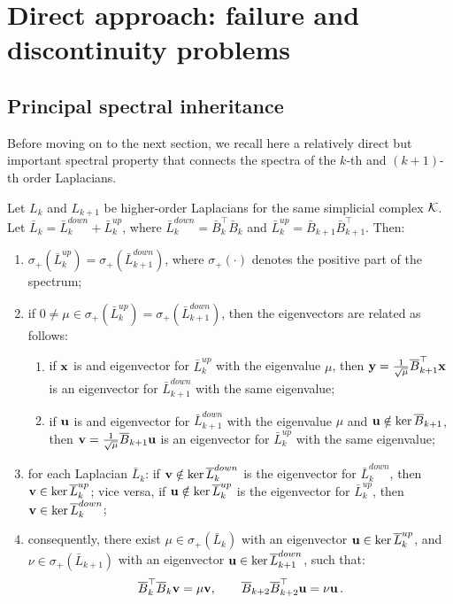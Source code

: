 \section{Direct approach: failure and discontinuity problems }


\subsection{Principal spectral inheritance}


Before moving on to the next section, we recall here a relatively direct  but important spectral property that connects the spectra of the $k$-th and $(k+1)$-th order Laplacians. 

\begin{theorem}\label{thm:inherit}
  Let $L_k$ and $L_{k+1}$ be  higher-order Laplacians for the same simplicial complex $\mathcal{K}$. Let $\bar L_k=\bar L_k^{down}+\bar L_k^{up}$, where $\bar L_k^{down}=\bar B_k^\top \bar B_k$ and $\bar L_k^{up}=\bar B_{k+1} \bar B_{k+1}^\top$. Then:
  \begin{enumerate}
    \item $\sigma_+(\bar L_k^{up})=\sigma_+(\bar L_{k+1}^{down})$, where $\sigma_+(\cdot)$ denotes the positive part of the spectrum;
    \item if $ 0 \ne \mu \in \sigma_+(\bar L_k^{up}) = \sigma_+(\bar L_{k+1}^{down})$, then the eigenvectors are related as follows:
    \begin{enumerate}
      \item if $\mathbf{x}$ is and eigenvector for $\bar L_k^{up}$ with the eigenvalue $\mu$, then $\mathbf{y} = \frac{1}{\sqrt{\mu}} \overline{B}_{k+1}^\top \mathbf{x}$ is an eigenvector for $\bar L_{k+1}^{down}$ with the same eigenvalue;
      \item if $\mathbf{u}$ is and eigenvector for $\bar L_{k+1}^{down}$ with the eigenvalue $\mu$ and $\mathbf{u} \notin \ker \overline{B}_{k+1}$, then $\mathbf{v} = \frac{1}{\sqrt{\mu}} \overline{B}_{k+1} \mathbf{u}$ is an eigenvector for $\bar L_{k}^{up}$ with the same eigenvalue;
    \end{enumerate}
    \item for each Laplacian $\bar L_k$: if $\mathbf{v} \notin \ker \overline{L}_k^{down}$ is the eigenvector for $\bar L_k^{down}$, then $\mathbf{v} \in \ker \overline{L}_{k}^{up}$; vice versa, if $\mathbf{u} \notin \ker \overline{L}_k^{up}$ is the eigenvector for $\bar L_k^{up}$, then $\mathbf{v} \in \ker \overline{L}_k^{down}$;
    \item consequently, there exist $\mu \in \sigma_+(\bar L_k)$ with an eigenvector $\mathbf{u} \in \ker \overline{L}_k^{up}$, and $\nu \in \sigma_+(\bar L_{k+1})$ with an eigenvector $\mathbf{u} \in \ker \overline{L}_{k+1}^{down}$, such that:
    $$
    \overline{B}_k^\top \overline{B}_k \mathbf{v}  = \mu \mathbf{v}, \qquad \overline{B}_{k+2} \overline{B}_{k+2}^\top \mathbf{u} = \nu \mathbf{u}\, . 
    $$
  \end{enumerate}
\end{theorem}
